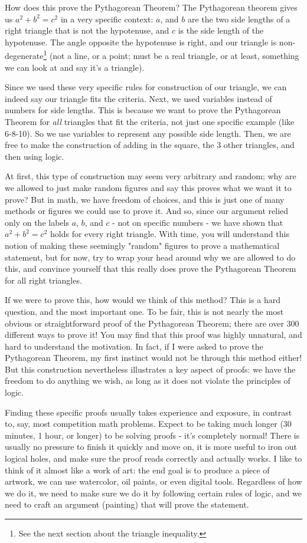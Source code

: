 How does this prove the Pythagorean Theorem? The Pythagorean theorem gives us $a^2 + b^2 = c^2$ in a very specific context: $a$, and $b$ are the two side lengths of a right triangle that is not the hypotenuse, and $c$ is the side length of the hypotenuse. The angle opposite the hypotenuse is right, and our triangle is non-degenerate\footnote{See the next section about the triangle inequality.} (not a line, or a point; must be a real triangle, or at least, something we can look at and say it's a triangle). 

Since we used these very specific rules for construction of our triangle, we can indeed say our triangle fits the criteria. Next, we used variables instead of numbers for side lengths. This is because we want to prove the Pythagorean Theorem for \emph{all} triangles that fit the criteria, not just one specific example (like 6-8-10). So we use variables to represent any possible side length. Then, we are free to make the construction of adding in the square, the 3 other triangles, and then using logic. 

At first, this type of construction may seem very arbitrary and random; why are we allowed to just make random figures and say this proves what we want it to prove? But in math, we have freedom of choices, and this is just one of many methods or figures we could use to prove it. And so, since our argument relied only on the labels $a$, $b$, and $c$ - not on specific numbers - we have shown that $a^2 + b^2 = c^2$ holds for every right triangle. With time, you will understand this notion of making these seemingly "random" figures to prove a mathematical statement, but for now, try to wrap your head around why we are allowed to do this, and convince yourself that this really does prove the Pythagorean Theorem for all right triangles. 

If we were to prove this, how would we think of this method? This is a hard question, and the most important one. To be fair, this is not nearly the most obvious or straightforward proof of the Pythagorean Theorem; there are over 300 different ways to prove it! You may find that this proof was highly unnatural, and hard to understand the motivation. In fact, if I were asked to prove the Pythagorean Theorem, my first instinct would not be through this method either! But this construction nevertheless illustrates a key aspect of proofs: we have the freedom to do anything we wish, as long as it does not violate the principles of logic. 

Finding these specific proofs usually takes experience and exposure, in contrast to, say, most competition math problems. Expect to be taking much longer (30 minutes, 1 hour, or longer) to be solving proofs - it's completely normal! There is usually no pressure to finish it quickly and move on, it is more useful to iron out logical holes, and make sure the proof reads correctly and actually works. I like to think of it almost like a work of art: the end goal is to produce a piece of artwork, we can use watercolor, oil paints, or even digital tools. Regardless of how we do it, we need to make sure we do it by following certain rules of logic, and we need to craft an argument (painting) that will prove the statement. 

